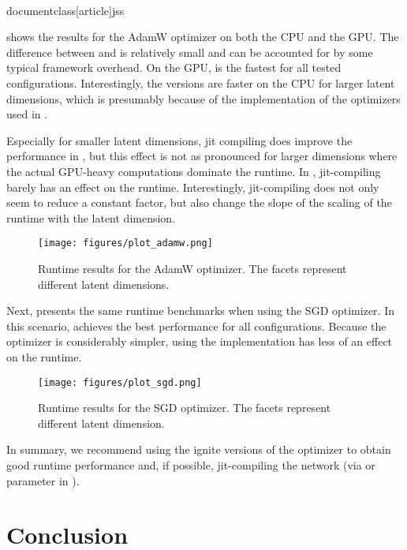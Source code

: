 \\documentclass[article]{jss}
\theoremstyle{definition}
\begin{document}
 shows the results for the AdamW optimizer on both the CPU and the GPU.
The difference between \torch{} and \mlrttorch{} is relatively small and can be accounted for by some typical framework overhead.
On the GPU, \pytorch{} is the fastest for all tested configurations.
Interestingly, the \rlang{} versions are faster on the CPU for larger latent dimensions, which is presumably because of the \libtorch{} implementation of the optimizers used in \rlang{}.

Especially for smaller latent dimensions, jit compiling does improve the performance in \rlang{}, but this effect is not as pronounced for larger dimensions where the actual GPU-heavy computations dominate the runtime.
In \pytorch{}, jit-compiling barely has an effect on the runtime.
Interestingly, jit-compiling does not only seem to reduce a constant factor, but also change the slope of the scaling of the runtime with the latent dimension.


\begin{figure}[h]
    \centering
    \texttt{[image: figures/plot\_adamw.png]}
    \caption{Runtime results for the AdamW optimizer. The facets represent different latent dimensions.}
    \label{fig:adamw-benchmark}
\end{figure}

Next,  presents the same runtime benchmarks when using the SGD optimizer.
In this scenario, \pytorch{} achieves the best performance for all configurations.
Because the optimizer is considerably simpler, using the \libtorch{} implementation has less of an effect on the runtime.

\begin{figure}[h]
    \centering
    \texttt{[image: figures/plot\_sgd.png]}
    \caption{Runtime results for the SGD optimizer. The facets represent different latent dimension.}
    \label{fig:sgd-benchmark}
\end{figure}

In summary, we recommend using the ignite versions of the optimizer to obtain good runtime performance and, if possible, jit-compiling the network (via  or  parameter in \mlrttorch{}).

\section{Conclusion}\label{sec:conclusion}
\end{document}

